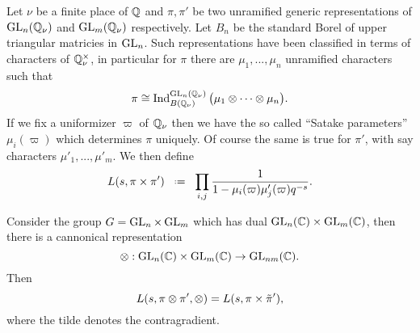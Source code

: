 \begin{example}
	Let \(\nu\) be a finite place of \(\Q\) and \(\pi, \pi'\) be two unramified generic representations of \(\GL_n(\Q_\nu)\) and \(\GL_m(\Q_\nu)\) respectively. Let \(B_n\) be the standard Borel of upper triangular matricies in \(\operatorname{GL}_n\). Such representations have been classified
	in terms of characters of \(\Q^\times_\nu\), in particular for \(\pi\) there are \(\mu_1, ..., \mu_n\) unramified characters such that 
	\[\pi \cong \Ind_{B(\Q_\nu)}^{\GL_n(\Q_\nu)} \big(\mu_1 \tensor \cdots \tensor \mu_n\big).\]
	If we fix a uniformizer \(\varpi\) of \(\Q_\nu\) then we have the so called ``Satake parameters'' \(\mu_i(\varpi)\) which determines \(\pi\) uniquely. Of course the same is true for \(\pi'\), with say characters \(\mu'_1, ..., \mu'_m\). We then define
	\[L(s, \pi\times \pi') \defeq \prod_{i,j} \frac{1}{1-\mu_i(\varpi)\mu'_j(\varpi)q^{-s}}.\]
	
	Consider the group \(G = \operatorname{GL}_n\times \operatorname{GL}_m\) which has dual \(\GL_n(\C) \times \GL_m(\C)\), then there is a cannonical representation 
	\[\tensor:\GL_n(\C) \times \GL_m(\C) \to \GL_{nm}(\C). \]
	Then 
	\[L(s, \pi\otimes \pi', \otimes) = L(s, \pi \times \tilde{\pi}'),\]
	where the tilde denotes the contragradient.
\end{example}

